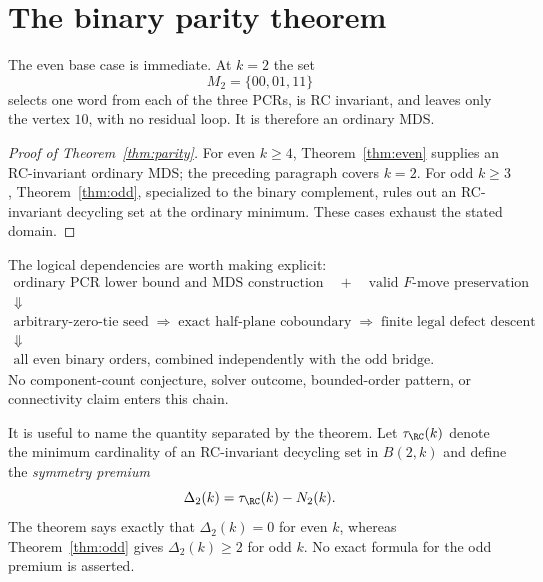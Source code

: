 \section{The binary parity theorem}
\label{sec:parity-proof}

The even base case is immediate.  At $k=2$ the set
\[
  M_2=\{00,01,11\}
\]
selects one word from each of the three PCRs, is RC invariant, and leaves
only the vertex $10$, with no residual loop.  It is therefore an ordinary
MDS.

\begin{proof}[Proof of Theorem~\ref{thm:parity}]
For even $k\geq4$, Theorem~\ref{thm:even} supplies an RC-invariant ordinary
MDS; the preceding paragraph covers $k=2$.  For odd $k\geq3$,
Theorem~\ref{thm:odd}, specialized to the binary complement, rules out an
RC-invariant decycling set at the ordinary minimum.  These cases exhaust the
stated domain.
\end{proof}

The logical dependencies are worth making explicit:
\[
\begin{array}{c}
\text{ordinary PCR lower bound and MDS construction}\quad+
\quad\text{valid $F$-move preservation}
\\[2mm]
\Downarrow
\\[-1mm]
\text{arbitrary-zero-tie seed}
\;\Longrightarrow\;
\text{exact half-plane coboundary}
\;\Longrightarrow\;
\text{finite legal defect descent}
\\[2mm]
\Downarrow
\\[-1mm]
\text{all even binary orders, combined independently with the odd bridge.}
\end{array}
\]
No component-count conjecture, solver outcome, bounded-order pattern, or
connectivity claim enters this chain.

It is useful to name the quantity separated by the theorem.  Let
$\tau_{\RC}(k)$ denote the minimum cardinality of an RC-invariant decycling
set in $B(2,k)$ and define the \emph{symmetry premium}
\[
  \Delta_2(k)=\tau_{\RC}(k)-N_2(k).
\]
The theorem says exactly that $\Delta_2(k)=0$ for even $k$, whereas
Theorem~\ref{thm:odd} gives $\Delta_2(k)\geq2$ for odd $k$.  No exact formula
for the odd premium is asserted.
